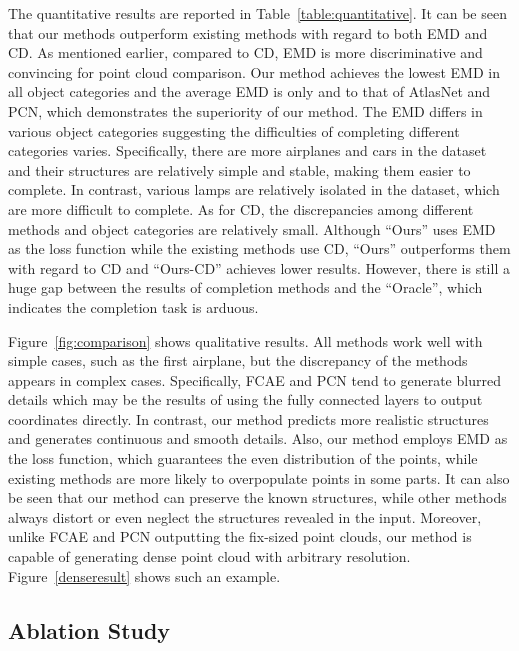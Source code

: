 \documentclass[letterpaper]{article} \usepackage{aaai20}  \usepackage{times}  \usepackage{helvet} \usepackage{courier}  \usepackage[hyphens]{url}  \usepackage{graphicx} \urlstyle{rm} \def\UrlFont{\rm}  \usepackage{graphicx}  \frenchspacing  \setlength{\pdfpagewidth}{8.5in}  \setlength{\pdfpageheight}{11in}  \usepackage{amsmath}
\begin{document}
The quantitative results are reported in Table~\ref{table:quantitative}. 
It can be seen that our methods outperform existing methods with regard to both EMD and CD. As mentioned earlier, compared to CD, EMD is more discriminative and convincing for point cloud comparison. Our method achieves the lowest EMD in all object categories and the average EMD is only  and  to that of AtlasNet and PCN, which demonstrates the superiority of our method. The EMD differs in various object categories suggesting the difficulties of completing different categories varies. Specifically, there are more airplanes and cars in the dataset and their structures are relatively simple and stable, making them easier to complete. In contrast, various lamps are relatively isolated in the dataset, which are more difficult to complete. As for CD, the discrepancies among different methods and object categories are relatively small. Although ``Ours'' uses EMD as the loss function while the existing methods use CD, ``Ours'' outperforms them with regard to CD and ``Ours-CD'' achieves lower results. However, there is still a huge gap between the results of completion methods and the ``Oracle'', which indicates the completion task is arduous.

Figure~\ref{fig:comparison} shows qualitative results. All methods work well with simple cases, such as the first airplane, but the discrepancy of the methods appears in complex cases. Specifically, FCAE and PCN tend to generate blurred details which may be the results of using the fully connected layers to output coordinates directly. In contrast, our method predicts more realistic structures and generates continuous and smooth details. Also, our method employs EMD as the loss function, which guarantees the even distribution of the points, while existing methods are more likely to overpopulate points in some parts. It can also be seen that our method can preserve the known structures, while other methods always distort or even neglect the structures revealed in the input. Moreover, unlike FCAE and PCN outputting the fix-sized point clouds, our method is capable of generating dense point cloud with arbitrary resolution. Figure~\ref{denseresult} shows such an example.






\subsection{Ablation Study}
\end{document}
